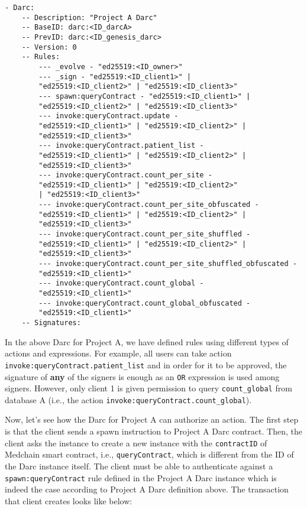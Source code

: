 \begin{verbatim}
- Darc:
    -- Description: "Project A Darc"
    -- BaseID: darc:<ID_darcA>
    -- PrevID: darc:<ID_genesis_darc>
    -- Version: 0
    -- Rules:
        --- _evolve - "ed25519:<ID_owner>" 
        --- _sign - "ed25519:<ID_client1>" | 
        "ed25519:<ID_client2>" | "ed25519:<ID_client3>"
        --- spawn:queryContract - "ed25519:<ID_client1>" | 
        "ed25519:<ID_client2>" | "ed25519:<ID_client3>"
        --- invoke:queryContract.update - 
        "ed25519:<ID_client1>" | "ed25519:<ID_client2>" |
        "ed25519:<ID_client3>"
        --- invoke:queryContract.patient_list - 
        "ed25519:<ID_client1>" | "ed25519:<ID_client2>" |
        "ed25519:<ID_client3>"
        --- invoke:queryContract.count_per_site - 
        "ed25519:<ID_client1>" | "ed25519:<ID_client2>" 
        | "ed25519:<ID_client3>"
        --- invoke:queryContract.count_per_site_obfuscated - 
        "ed25519:<ID_client1>" | "ed25519:<ID_client2>" | 
        "ed25519:<ID_client3>"
        --- invoke:queryContract.count_per_site_shuffled - 
        "ed25519:<ID_client1>" | "ed25519:<ID_client2>" |
        "ed25519:<ID_client3>"
        --- invoke:queryContract.count_per_site_shuffled_obfuscated - 
        "ed25519:<ID_client1>" 
        --- invoke:queryContract.count_global - 
        "ed25519:<ID_client1>" 
        --- invoke:queryContract.count_global_obfuscated - 
        "ed25519:<ID_client1>" 
    -- Signatures:
\end{verbatim}

In the above Darc for Project A, we have defined rules using different types of actions and expressions. For example, all users can take action  \texttt{invoke:queryContract.patient\_list} and in order for it to be approved, the signature of \textbf{any} of the signers is enough as an \texttt{OR} expression is used among signers. However, only client 1 is given permission to query \texttt{count\_global} from database A (i.e., the action \texttt{invoke:queryContract.count\_global}). 

Now, let's see how the Darc for Project A can authorize an action. The first step is that the client sends a spawn instruction to Project A Darc contract. Then, the client asks the instance to create a new instance with the \texttt{contractID} of Medchain smart contract, i.e., \texttt{queryContract}, which is different from the ID of the Darc instance itself. The client must be able to authenticate against a \texttt{spawn:queryContract} rule defined in the Project A Darc instance which is indeed the case according to Project A Darc definition above. The transaction that client creates looks like below:


